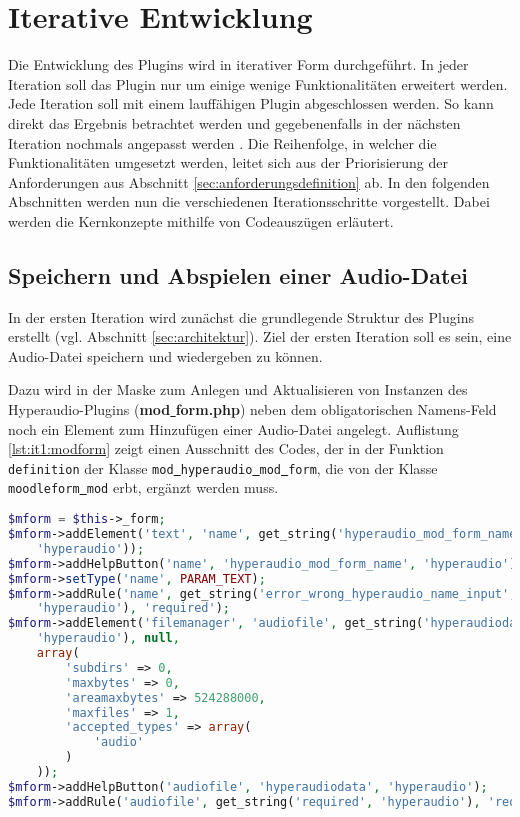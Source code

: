 \section{Iterative Entwicklung}
Die Entwicklung des Plugins wird in iterativer Form durchgeführt. In jeder Iteration soll das Plugin nur um einige wenige Funktionalitäten erweitert werden. Jede Iteration soll mit einem lauffähigen Plugin abgeschlossen werden. So kann direkt das Ergebnis betrachtet werden und gegebenenfalls in der nächsten Iteration nochmals angepasst werden \citep{augsten2018iterativ}. Die Reihenfolge, in welcher die Funktionalitäten umgesetzt werden, leitet sich aus der Priorisierung der Anforderungen aus Abschnitt \ref{sec:anforderungsdefinition} ab. In den folgenden Abschnitten werden nun die verschiedenen Iterationsschritte vorgestellt. Dabei werden die Kernkonzepte mithilfe von Codeauszügen erläutert. 

\subsection{Speichern und Abspielen einer Audio-Datei}
\label{sec:it1}
In der ersten Iteration wird zunächst die grundlegende Struktur des Plugins erstellt (vgl. Abschnitt \ref{sec:architektur}). Ziel der ersten Iteration soll es sein, eine Audio-Datei speichern und wiedergeben zu können.

Dazu wird in der Maske zum Anlegen und Aktualisieren von Instanzen des Hyperaudio-Plugins (\textbf{mod\underline{{ }}form.php}) neben dem obligatorischen Namens-Feld noch ein Element zum Hinzufügen einer Audio-Datei angelegt. Auflistung \ref{lst:it1:modform} zeigt einen Ausschnitt des Codes, der in der Funktion \texttt{definition} der Klasse \texttt{mod\underline{{ }}hyperaudio\underline{{ }}mod\underline{{ }}form}, die von der Klasse \texttt{moodleform\underline{{ }}mod} erbt, ergänzt werden muss. 

\begin{lstlisting}[language=php,
             linewidth=\textwidth,
             caption={Ausschnitt der \textbf{mod\underline{{ }}form.php} in der 1. Iteration},
             label={lst:it1:modform}]
$mform = $this->_form;
$mform->addElement('text', 'name', get_string('hyperaudio_mod_form_name',
    'hyperaudio'));
$mform->addHelpButton('name', 'hyperaudio_mod_form_name', 'hyperaudio');
$mform->setType('name', PARAM_TEXT);
$mform->addRule('name', get_string('error_wrong_hyperaudio_name_input',
    'hyperaudio'), 'required');
$mform->addElement('filemanager', 'audiofile', get_string('hyperaudiodata',
    'hyperaudio'), null,
    array(
        'subdirs' => 0,
        'maxbytes' => 0,
        'areamaxbytes' => 524288000,
        'maxfiles' => 1,
        'accepted_types' => array(
            'audio'
        )
    ));
$mform->addHelpButton('audiofile', 'hyperaudiodata', 'hyperaudio');
$mform->addRule('audiofile', get_string('required', 'hyperaudio'), 'required');
\end{lstlisting}

